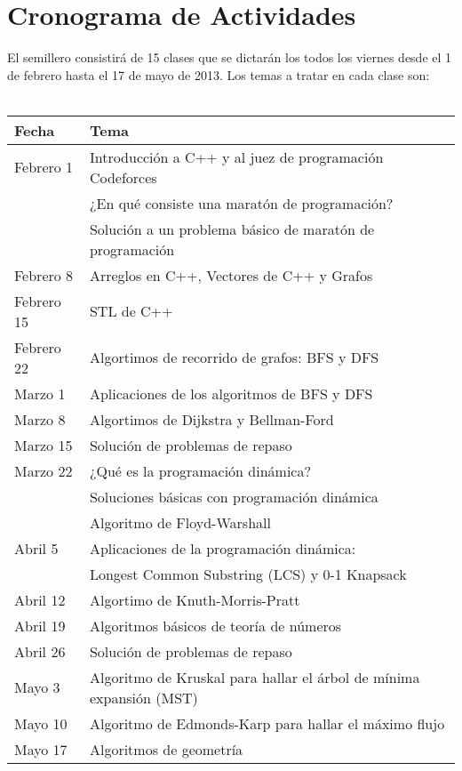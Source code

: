 \documentclass[11pt, oneside]{article}
\theoremstyle{definition}
\theoremstyle{remark}
\begin{document}
\section{Cronograma de Actividades}
El semillero consistirá de 15 clases que se dictarán los todos los viernes desde el 1 de febrero hasta el 17 de mayo de 2013. Los temas a tratar en cada clase son: \\ \quad \\
\begin{tabular}{|l|l|}
	\hline
	\textbf{Fecha} & \textbf{Tema} \\
	\hline \hline
	Febrero 1 & Introducción a C++ y al juez de programación Codeforces\\
	          & ¿En qué consiste una maratón de programación?\\
			  & Solución a un problema básico de maratón de programación  \qquad \qquad \qquad \qquad\\
	\hline
	Febrero 8 & Arreglos en C++, Vectores de C++ y Grafos\\
	\hline
	Febrero 15 & STL de C++\\
	\hline
	Febrero 22 & Algortimos de recorrido de grafos: BFS y DFS\\
	\hline
	Marzo 1 & Aplicaciones de los algoritmos de BFS y DFS\\
	\hline
	Marzo 8 & Algortimos de Dijkstra y Bellman-Ford\\
	\hline
	Marzo 15 & Solución de problemas de repaso\\
	\hline
	Marzo 22 & ¿Qué es la programación dinámica?\\
	         & Soluciones básicas con programación dinámica\\
	         & Algoritmo de Floyd-Warshall\\
	\hline
	Abril 5 & Aplicaciones de la programación dinámica:\\
	        & Longest Common Substring (LCS) y 0-1 Knapsack\\
	\hline
	Abril 12 & Algortimo de Knuth-Morris-Pratt\\
	\hline
	Abril 19 & Algoritmos básicos de teoría de números\\
	\hline
	Abril 26 & Solución de problemas de repaso\\
	\hline
	Mayo 3 & Algoritmo de Kruskal para hallar el árbol de mínima expansión (MST)\\
	\hline
	Mayo 10 & Algoritmo de Edmonds-Karp para hallar el máximo flujo\\
	\hline
	Mayo 17 & Algoritmos de geometría\\
	\hline
\end{tabular}
\end{document}
